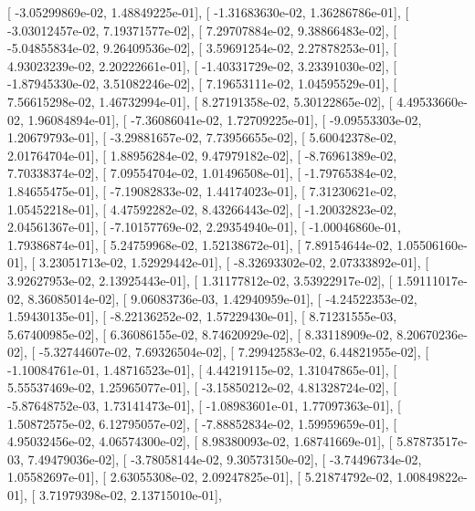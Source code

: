 \documentclass{article}
\begin{document}
       [ -3.05299869e-02,   1.48849225e-01],
       [ -1.31683630e-02,   1.36286786e-01],
       [ -3.03012457e-02,   7.19371577e-02],
       [  7.29707884e-02,   9.38866483e-02],
       [ -5.04855834e-02,   9.26409536e-02],
       [  3.59691254e-02,   2.27878253e-01],
       [  4.93023239e-02,   2.20222661e-01],
       [ -1.40331729e-02,   3.23391030e-02],
       [ -1.87945330e-02,   3.51082246e-02],
       [  7.19653111e-02,   1.04595529e-01],
       [  7.56615298e-02,   1.46732994e-01],
       [  8.27191358e-02,   5.30122865e-02],
       [  4.49533660e-02,   1.96084894e-01],
       [ -7.36086041e-02,   1.72709225e-01],
       [ -9.09553303e-02,   1.20679793e-01],
       [ -3.29881657e-02,   7.73956655e-02],
       [  5.60042378e-02,   2.01764704e-01],
       [  1.88956284e-02,   9.47979182e-02],
       [ -8.76961389e-02,   7.70338374e-02],
       [  7.09554704e-02,   1.01496508e-01],
       [ -1.79765384e-02,   1.84655475e-01],
       [ -7.19082833e-02,   1.44174023e-01],
       [  7.31230621e-02,   1.05452218e-01],
       [  4.47592282e-02,   8.43266443e-02],
       [ -1.20032823e-02,   2.04561367e-01],
       [ -7.10157769e-02,   2.29354940e-01],
       [ -1.00046860e-01,   1.79386874e-01],
       [  5.24759968e-02,   1.52138672e-01],
       [  7.89154644e-02,   1.05506160e-01],
       [  3.23051713e-02,   1.52929442e-01],
       [ -8.32693302e-02,   2.07333892e-01],
       [  3.92627953e-02,   2.13925443e-01],
       [  1.31177812e-02,   3.53922917e-02],
       [  1.59111017e-02,   8.36085014e-02],
       [  9.06083736e-03,   1.42940959e-01],
       [ -4.24522353e-02,   1.59430135e-01],
       [ -8.22136252e-02,   1.57229430e-01],
       [  8.71231555e-03,   5.67400985e-02],
       [  6.36086155e-02,   8.74620929e-02],
       [  8.33118909e-02,   8.20670236e-02],
       [ -5.32744607e-02,   7.69326504e-02],
       [  7.29942583e-02,   6.44821955e-02],
       [ -1.10084761e-01,   1.48716523e-01],
       [  4.44219115e-02,   1.31047865e-01],
       [  5.55537469e-02,   1.25965077e-01],
       [ -3.15850212e-02,   4.81328724e-02],
       [ -5.87648752e-03,   1.73141473e-01],
       [ -1.08983601e-01,   1.77097363e-01],
       [  1.50872575e-02,   6.12795057e-02],
       [ -7.88852834e-02,   1.59959659e-01],
       [  4.95032456e-02,   4.06574300e-02],
       [  8.98380093e-02,   1.68741669e-01],
       [  5.87873517e-03,   7.49479036e-02],
       [ -3.78058144e-02,   9.30573150e-02],
       [ -3.74496734e-02,   1.05582697e-01],
       [  2.63055308e-02,   2.09247825e-01],
       [  5.21874792e-02,   1.00849822e-01],
       [  3.71979398e-02,   2.13715010e-01],
\end{document}
